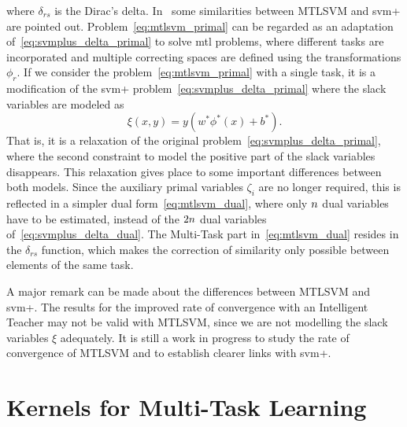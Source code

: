 where $\delta_{rs}$ is the Dirac's delta.
In~\cite{LiangC08} some similarities between MTLSVM and \acrshort{svm}+ are pointed out. Problem~\eqref{eq:mtlsvm_primal} can be regarded as an adaptation of~\eqref{eq:svmplus_delta_primal} to solve \acrshort{mtl} problems, where different tasks are incorporated and multiple correcting spaces are defined using the transformations $\phi_r$.
If we consider the problem~\eqref{eq:mtlsvm_primal} with a single task, it is a modification of the \acrshort{svm}+ problem~\eqref{eq:svmplus_delta_primal} where the slack variables are modeled as
$$ \xi(x, y) = y (w^* \phi^*(x) + b^*)  .$$
That is, it is a relaxation of the original problem~\eqref{eq:svmplus_delta_primal}, where the second constraint to model the positive part of the slack variables disappears.
This relaxation gives place to some important differences between both models. Since the auxiliary primal variables $\zeta_i$ are no longer required, this is reflected in a simpler dual form~\eqref{eq:mtlsvm_dual}, where only $n$ dual variables have to be estimated, instead of the $2n$ dual variables of~\eqref{eq:svmplus_delta_dual}.
The Multi-Task part in~\eqref{eq:mtlsvm_dual} resides in the $\delta_{rs}$ function, which makes the correction of similarity only possible between elements of the same task.
%

A major remark can be made about the differences between MTLSVM and \acrshort{svm}+. The results for the improved rate of convergence with an Intelligent Teacher may not be valid with MTLSVM, since we are not modelling the slack variables $\xi$ adequately. 
It is still a work in progress to study the rate of convergence of MTLSVM and to establish clearer links with \acrshort{svm}+.







\section{Kernels for Multi-Task Learning}\label{sec:ch3_mtl_kernelmethods}


